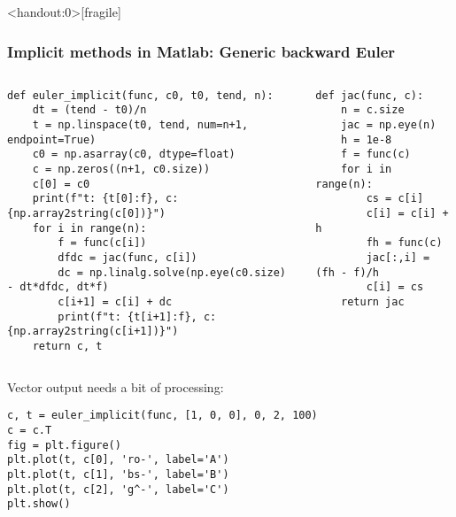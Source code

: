 \begin{frame}<handout:0>[fragile]
\frametitle{Implicit methods in Matlab: Generic backward Euler}
  \begin{columns}
      \begin{lstlisting}
def euler_implicit(func, c0, t0, tend, n):
    dt = (tend - t0)/n
    t = np.linspace(t0, tend, num=n+1, endpoint=True)
    c0 = np.asarray(c0, dtype=float)
    c = np.zeros((n+1, c0.size))
    c[0] = c0
    print(f"t: {t[0]:f}, c: {np.array2string(c[0])}")
    for i in range(n):
        f = func(c[i])
        dfdc = jac(func, c[i])
        dc = np.linalg.solve(np.eye(c0.size) - dt*dfdc, dt*f)
        c[i+1] = c[i] + dc
        print(f"t: {t[i+1]:f}, c: {np.array2string(c[i+1])}")
    return c, t
      \end{lstlisting}
      \begin{lstlisting}
def jac(func, c):
    n = c.size
    jac = np.eye(n)
    h = 1e-8
    f = func(c)
    for i in range(n):
        cs = c[i]
        c[i] = c[i] + h
        fh = func(c)
        jac[:,i] = (fh - f)/h
        c[i] = cs
    return jac
      \end{lstlisting}
  \end{columns}
  Vector output needs a bit of processing:
  \begin{lstlisting}
c, t = euler_implicit(func, [1, 0, 0], 0, 2, 100)
c = c.T
fig = plt.figure()
plt.plot(t, c[0], 'ro-', label='A')
plt.plot(t, c[1], 'bs-', label='B')
plt.plot(t, c[2], 'g^-', label='C')
plt.show()
  \end{lstlisting}
\end{frame}


